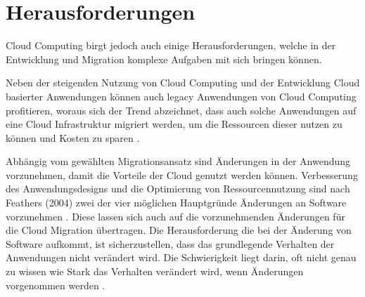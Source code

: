 \section{Herausforderungen}


Cloud Computing birgt jedoch auch einige Herausforderungen, welche in der Entwicklung und Migration komplexe Aufgaben mit sich bringen können.

Neben der steigenden Nutzung von Cloud Computing und der Entwicklung Cloud basierter Anwendungen können auch legacy Anwendungen von Cloud Computing profitieren, woraus sich der Trend abzeichnet, dass auch solche Anwendungen auf eine Cloud Infrastruktur migriert werden, um die Ressourcen dieser nutzen zu können und Kosten zu sparen \cite[Vgl.][S. 31]{Maenhaut2016}.

Abhängig vom gewählten Migrationsansatz sind Änderungen in der Anwendung vorzunehmen, damit die Vorteile der Cloud genutzt werden können. Verbesserung des Anwendungsdesigns und die Optimierung von Ressourcennutzung sind nach Feathers (2004) zwei der vier möglichen Hauptgründe Änderungen an Software vorzunehmen \cite[Vgl.][S. 3]{Feathers2004}. Diese lassen sich auch auf die vorzunehmenden Änderungen für die Cloud Migration übertragen. Die Herausforderung die bei der Änderung von Software aufkommt, ist sicherzustellen, dass das grundlegende Verhalten der Anwendungen nicht verändert wird. Die Schwierigkeit liegt darin, oft nicht genau zu wissen wie Stark das Verhalten verändert wird, wenn Änderungen vorgenommen werden \cite[Vgl.][S. 7]{Feathers2004}. \pagebreak
